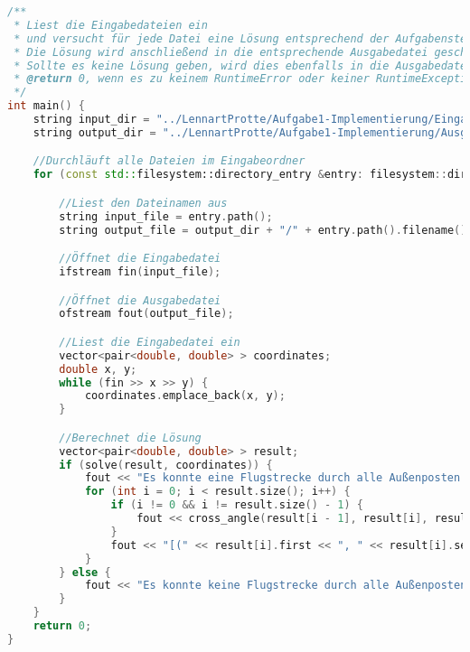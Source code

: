 \documentclass[a4paper,10pt,ngerman]{scrartcl}
\begin{document}
\begin{lstlisting}[frame=single,language=C++,title=Methode graphFromLines,breaklines=true]
    /**
 * Liest die Eingabedateien ein 
 * und versucht für jede Datei eine Lösung entsprechend der Aufgabenstellung zu finden
 * Die Lösung wird anschließend in die entsprechende Ausgabedatei geschrieben
 * Sollte es keine Lösung geben, wird dies ebenfalls in die Ausgabedatei geschrieben
 * @return 0, wenn es zu keinem RuntimeError oder keiner RuntimeException gekommen ist
 */
int main() {
    string input_dir = "../LennartProtte/Aufgabe1-Implementierung/Eingabedateien";
    string output_dir = "../LennartProtte/Aufgabe1-Implementierung/Ausgabedateien";

    //Durchläuft alle Dateien im Eingabeordner
    for (const std::filesystem::directory_entry &entry: filesystem::directory_iterator(input_dir)) {

        //Liest den Dateinamen aus
        string input_file = entry.path();
        string output_file = output_dir + "/" + entry.path().filename().string();

        //Öffnet die Eingabedatei
        ifstream fin(input_file);

        //Öffnet die Ausgabedatei
        ofstream fout(output_file);

        //Liest die Eingabedatei ein
        vector<pair<double, double> > coordinates;
        double x, y;
        while (fin >> x >> y) {
            coordinates.emplace_back(x, y);
        }

        //Berechnet die Lösung
        vector<pair<double, double> > result;
        if (solve(result, coordinates)) {
            fout << "Es konnte eine Flugstrecke durch alle Außenposten ermittelt werden" << endl;
            for (int i = 0; i < result.size(); i++) {
                if (i != 0 && i != result.size() - 1) {
                    fout << cross_angle(result[i - 1], result[i], result[i + 1]) << "° ";
                }
                fout << "[(" << result[i].first << ", " << result[i].second << ")] -> " << endl;
            }
        } else {
            fout << "Es konnte keine Flugstrecke durch alle Außenposten ermittelt werde" << endl;
        }
    }
    return 0;
}
\end{lstlisting}
	
\end{document}
